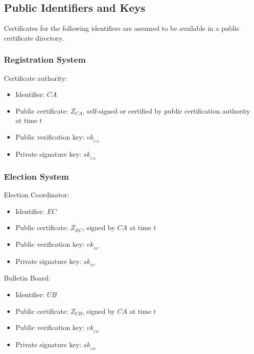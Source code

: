\documentclass[bibtotoc,halfparskip,oneside]{scrreprt}
\newcommand{\sk}[1]{\mathit{sk}_{#1}\xspace}
\newcommand{\vk}[1]{\mathit{vk}_{#1}\xspace}
\newcommand{\SK}[1]{\sk{_#1}\xspace}
\newcommand{\VK}[1]{\vk{_#1}\xspace}
\newcommand{\CA}{\ensuremath{\mathit{CA}}\xspace}
\newcommand{\EC}{\ensuremath{\mathit{EC}}\xspace}
\newcommand{\UB}{\ensuremath{\mathit{UB}}\xspace}
\begin{document}
\subsection{Public Identifiers and Keys}

Certificates for the following identifiers are assumed to be available in a public certificate directory.

\subsubsection{Registration System}


Certificate authority:
\begin{itemize}
	\item Identifier: \CA
	\item Public certificate: $Z_{\CA}$, self-signed or certified by public certification authority at time $t$
	\item Public verification key: $\VK{\CA}$
	\item Private signature key: $\SK{\CA}$
\end{itemize}

\subsubsection{Election System}

Election Coordinator:
\begin{itemize}
	\item Identifier: \EC
	\item Public certificate: $Z_{\EC}$, signed by \CA at time $t$
	\item Public verification key: $\VK{\EC}$ 
	\item Private signature key: $\SK{\EC}$
\end{itemize}

Bulletin Board:
\begin{itemize}
	\item Identifier: \UB
	\item Public certificate: $Z_{\UB}$, signed by \CA at time $t$
	\item Public verification key: $\VK{\UB}$ 
	\item Private signature key: $\SK{\UB}$
\end{itemize}
\end{document}
